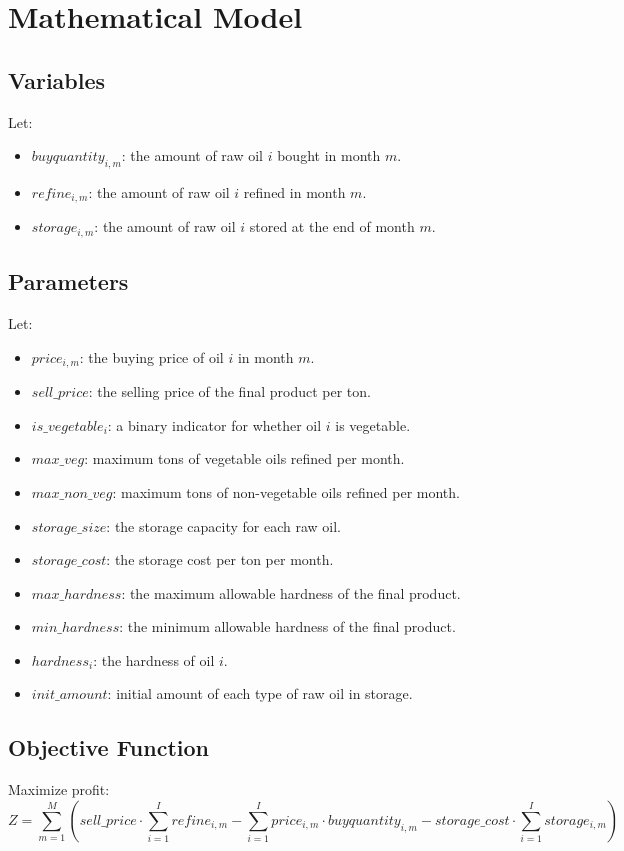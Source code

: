 \documentclass{article}
\begin{document}
\section*{Mathematical Model}

\subsection*{Variables}
Let:
\begin{itemize}
    \item $buyquantity_{i,m}$: the amount of raw oil $i$ bought in month $m$.
    \item $refine_{i,m}$: the amount of raw oil $i$ refined in month $m$.
    \item $storage_{i,m}$: the amount of raw oil $i$ stored at the end of month $m$.
\end{itemize}

\subsection*{Parameters}
Let:
\begin{itemize}
    \item $price_{i,m}$: the buying price of oil $i$ in month $m$.
    \item $sell\_price$: the selling price of the final product per ton.
    \item $is\_vegetable_{i}$: a binary indicator for whether oil $i$ is vegetable.
    \item $max\_veg$: maximum tons of vegetable oils refined per month.
    \item $max\_non\_veg$: maximum tons of non-vegetable oils refined per month.
    \item $storage\_size$: the storage capacity for each raw oil.
    \item $storage\_cost$: the storage cost per ton per month.
    \item $max\_hardness$: the maximum allowable hardness of the final product.
    \item $min\_hardness$: the minimum allowable hardness of the final product.
    \item $hardness_{i}$: the hardness of oil $i$.
    \item $init\_amount$: initial amount of each type of raw oil in storage.
\end{itemize}

\subsection*{Objective Function}
Maximize profit:
\[
Z = \sum_{m=1}^{M} \left( sell\_price \cdot \sum_{i=1}^{I} refine_{i,m} - \sum_{i=1}^{I} price_{i,m} \cdot buyquantity_{i,m} - storage\_cost \cdot \sum_{i=1}^{I} storage_{i,m} \right)
\]
\end{document}
